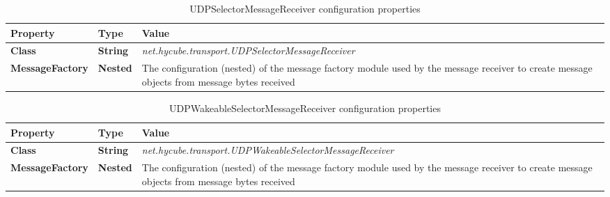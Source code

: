 \begin{table}
\scriptsize
\begin{center}
\begin{tabular}{p{5.0cm} p{1.0cm} p{8.5cm}}
	\hline
	\textbf{Property}							& \textbf{Type}					& \textbf{Value}					\\[1mm]
    \hline
	\textbf{Class}								& \textbf{String}				& \textit{net.hycube.transport.UDPSelectorMessageReceiver}							\\[1.5mm]	
	\textbf{MessageFactory}						& \textbf{Nested}				& The configuration (nested) of the message factory module used by the message receiver to create message objects from message bytes received 			\\[1.5mm]	
    \hline
\end{tabular}
\end{center}
\caption{UDPSelectorMessageReceiver configuration properties}
\label{tab:libUDPSelectorMessageReceiver}
\end{table}

\begin{table}
\scriptsize
\begin{center}
\begin{tabular}{p{5.0cm} p{1.0cm} p{8.5cm}}
	\hline
	\textbf{Property}							& \textbf{Type}					& \textbf{Value}					\\[1mm]
    \hline
	\textbf{Class}								& \textbf{String}				& \textit{net.hycube.transport.UDPWakeableSelectorMessageReceiver}							\\[1.5mm]	
	\textbf{MessageFactory}						& \textbf{Nested}				& The configuration (nested) of the message factory module used by the message receiver to create message objects from message bytes received 			\\[1.5mm]	
    \hline
\end{tabular}
\end{center}
\caption{UDPWakeableSelectorMessageReceiver configuration properties}
\label{tab:libUDPWakeableSelectorMessageReceiver}
\end{table}



